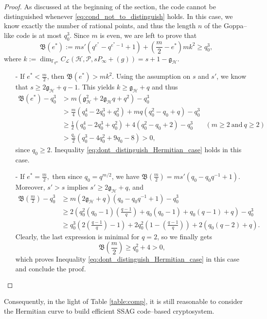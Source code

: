 \documentclass[lettersize,journal]{IEEEtran}
\theoremstyle{plain}
\theoremstyle{definition}
\theoremstyle{remark}
\newcommand{\calP}{\mathcal{P}}
\newcommand{\calH}{\mathcal{H}}
\newcommand{\fqm}{\mathbb{F}_{q^m}}
\begin{document}
	\begin{proof}
		As discussed at the beginning of the section, the code cannot be distinguished whenever \eqref{eq:cond_not_to_distinguish} holds. In this case, we know exactly the number of rational points, and thus the length $n$ of the Goppa--like code is at most $q_0^3$. Since $m$ is even, we are left to prove that 
		\begin{equation} \label{eq:dont_distinguish_Hermitian_case}
			\mathfrak{B}(e^*) := ms'(q^{e^*}-q^{e^*-1}+1) + \left( \frac{m}{2}-e^*\right)mk^2 \geq q_0^3,
		\end{equation}
		where $k  := \dim_{\fqm} C_{\mathcal{L}}(\calH, \calP, sP_\infty + (g)) = s+1-\mathfrak{g}_{\calH}$.
		\begin{itemize}
			\item [-] If $e^* < \frac{m}{2}$, then $\mathfrak{B}(e^*) > mk^2$. Using the assumption on $s$ and $s'$, we know that $s \geq 2\mathfrak{g}_{\calH}+q-1$. This yields $k \geq \mathfrak{g}_{\calH}+q$ and thus
			\begin{align*}
				\mathfrak{B}(e^*) - q_0^3 
				&> m(\mathfrak{g}_{\calH}^2+2\mathfrak{g}_{\calH}q+q^2)-q_0^3&\\
				& > \frac{m}{4}(q_0^4-2q_0^3+q_0^2) + mq(q_0^2-q_0+q) -q_0^3 &\\
				& \geq \frac{1}{2}(q_0^4-2q_0^3+q_0^2)+4(q_0^2-q_0+2)-q_0^3 \quad &(m\geq 2 \ \mathrm{and} \ q\geq 2)&\\
				& > \frac{q_0}{2} (q_0^3-4q_0^2+9q_0-8) > 0,&
			\end{align*}
			since $q_0 \geq 2$. Inequality \eqref{eq:dont_distinguish_Hermitian_case} holds in this case.
			\item[-] If $e^* = \frac{m}{2},$ then since $q_0=q^{m/2}$, we have $\mathfrak{B}\left(\frac{m}{2}\right) = ms'(q_0-q_0q^{-1}+1)$. Moreover, $s'>s$ implies $s' \geq 2\mathfrak{g}_{\calH}+q$, and
			\begin{align*}
				\mathfrak{B}\left(\frac{m}{2}\right) - q_0^3 
				&\geq m(2\mathfrak{g}_{\calH}+q)(q_0-q_0q^{-1}+1)-q_0^3 \\ 
				&\geq 2\left(q_0^2(q_0-1)\left(\frac{q-1}{q}\right)+q_0(q_0-1)+q_0(q-1)+q\right)-q_0^3 \\
				& \geq q_0^3\left(2\left(\frac{q-1}{q}\right)-1\right) + 2q_0^2\left(1-\left(\frac{q-1}{q}\right)\right) + 2(q_0(q-2)+q).
			\end{align*}
			Clearly, the last expression is minimal for $q=2$, so we finally gets
			$$\mathfrak{B}\left(\frac{m}{2}\right) \geq q_0^2 + 4 >0,$$
			which proves Inequality \eqref{eq:dont_distinguish_Hermitian_case} in this case and conclude the proof.
		\end{itemize}
	\end{proof}
	Consequently, in the light of Table \ref{table:comp}, it is still reasonable to consider the Hermitian curve to build efficient SSAG code--based cryptosystem.
	

	
	

	
	\newpage
	


\end{document}
